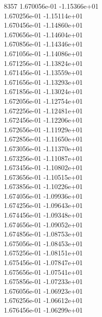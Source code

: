 8357	1.670056e-01	-1.15366e+01	\\ 	1.670256e-01	-1.15114e+01	\\ 	1.670456e-01	-1.14860e+01	\\ 	1.670656e-01	-1.14604e+01	\\ 	1.670856e-01	-1.14346e+01	\\ 	1.671056e-01	-1.14086e+01	\\ 	1.671256e-01	-1.13824e+01	\\ 	1.671456e-01	-1.13559e+01	\\ 	1.671656e-01	-1.13293e+01	\\ 	1.671856e-01	-1.13024e+01	\\ 	1.672056e-01	-1.12754e+01	\\ 	1.672256e-01	-1.12481e+01	\\ 	1.672456e-01	-1.12206e+01	\\ 	1.672656e-01	-1.11929e+01	\\ 	1.672856e-01	-1.11650e+01	\\ 	1.673056e-01	-1.11370e+01	\\ 	1.673256e-01	-1.11087e+01	\\ 	1.673456e-01	-1.10802e+01	\\ 	1.673656e-01	-1.10515e+01	\\ 	1.673856e-01	-1.10226e+01	\\ 	1.674056e-01	-1.09936e+01	\\ 	1.674256e-01	-1.09643e+01	\\ 	1.674456e-01	-1.09348e+01	\\ 	1.674656e-01	-1.09052e+01	\\ 	1.674856e-01	-1.08753e+01	\\ 	1.675056e-01	-1.08453e+01	\\ 	1.675256e-01	-1.08151e+01	\\ 	1.675456e-01	-1.07847e+01	\\ 	1.675656e-01	-1.07541e+01	\\ 	1.675856e-01	-1.07233e+01	\\ 	1.676056e-01	-1.06923e+01	\\ 	1.676256e-01	-1.06612e+01	\\ 	1.676456e-01	-1.06299e+01	\\ \hline
